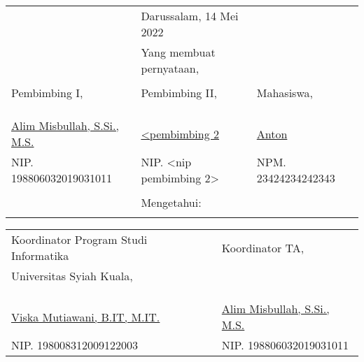 \vspace{0.4cm}
{\renewcommand{\arraystretch}{0.8}
\centering
\begin{tabular}{lll}
	&Darussalam, 14 Mei 2022		& \\
	&Yang membuat pernyataan,			& \\
	&&\\
	Pembimbing I,							&Pembimbing II,							&Mahasiswa,\\
	&&\\
	&&\\
	&&\\
	\underline{Alim Misbullah, S.Si., M.S.}	&\underline{<pembimbing 2} &\underline{Anton}\\
	NIP. 198806032019031011				&NIP. <nip pembimbing 2>				&NPM. 23424234242343\\
	&&\\
	&Mengetahui:\\			&
\end{tabular}
}
{\renewcommand{\arraystretch}{0.8}
\begin{tabular}{lll}
	Koordinator Program Studi Informatika	&\qquad\qquad  &Koordinator TA,\\
	Universitas Syiah Kuala,&\quad\quad  &\\
	&&\\
	&&\\
	&&\\
	\underline{Viska Mutiawani, B.IT, M.IT.}	&\quad\quad  &\underline{Alim Misbullah, S.Si., M.S.}\\
	NIP. 198008312009122003						&\quad\quad  &NIP. 198806032019031011				
\end{tabular}
}